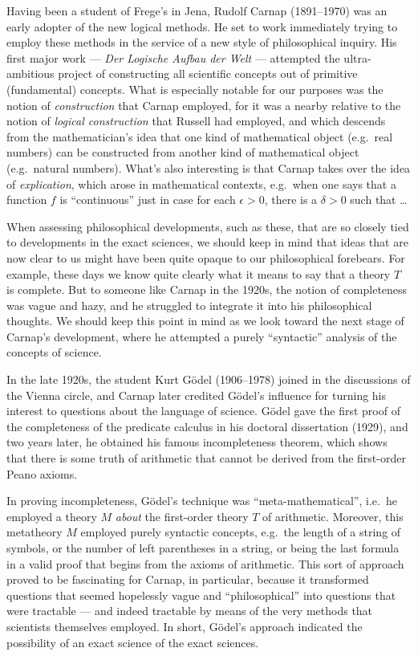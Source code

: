 Having been a student of Frege's in Jena, Rudolf Carnap (1891--1970)
was an early adopter of the new logical methods.  He set to work
immediately trying to employ these methods in the service of a new
style of philosophical inquiry.  His first major work --- {\it Der
  Logische Aufbau der Welt} \citeyearpar{carnap1928} --- attempted the
ultra-ambitious project of constructing all scientific concepts out of
primitive (fundamental) concepts.  What is especially notable for our
purposes was the notion of {\it construction} that Carnap employed,
for it was a nearby relative to the notion of {\it logical
  construction} that Russell had employed, and which descends from the
mathematician's idea that one kind of mathematical object (e.g.\ real
numbers) can be constructed from another kind of mathematical object
(e.g.\ natural numbers).  What's also interesting is that Carnap takes
over the idea of {\it explication}, which arose in mathematical
contexts, e.g.\ when one says that a function $f$ is ``continuous''
just in case for each $\epsilon >0$, there is a $\delta >0$ such that
\dots

When assessing philosophical developments, such as these, that are so
closely tied to developments in the exact sciences, we should keep in
mind that ideas that are now clear to us might have been quite opaque
to our philosophical forebears.  For example, these days we know quite
clearly what it means to say that a theory $T$ is complete.  But to
someone like Carnap in the 1920s, the notion of completeness was vague
and hazy, and he struggled to integrate it into his philosophical
thoughts.  We should keep this point in mind as we look toward the
next stage of Carnap's development, where he attempted a purely
``syntactic'' analysis of the concepts of science.

In the late 1920s, the student Kurt G\"odel (1906--1978) joined in the
discussions of the Vienna circle, and Carnap later credited G\"odel's
influence for turning his interest to questions about the language of
science.  G\"odel gave the first proof of the completeness of the
predicate calculus in his doctoral dissertation (1929), and two years
later, he obtained his famous incompleteness theorem, which shows that
there is some truth of arithmetic that cannot be derived from the
first-order Peano axioms.

In proving incompleteness, G\"odel's technique was
``meta-mathematical'', i.e.\ he employed a theory $M$ {\it about} the
first-order theory $T$ of arithmetic.  Moreover, this metatheory $M$
employed purely syntactic concepts, e.g.\ the length of a string of
symbols, or the number of left parentheses in a string, or being the
last formula in a valid proof that begins from the axioms of
arithmetic.  This sort of approach proved to be fascinating for
Carnap, in particular, because it transformed questions that seemed
hopelessly vague and ``philosophical'' into questions that were
tractable --- and indeed tractable by means of the very methods that
scientists themselves employed.  In short, G\"odel's approach
indicated the possibility of an exact science of the exact sciences.

